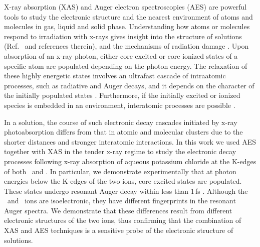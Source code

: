 X-ray absorption (XAS) and Auger electron spectroscopies (AES) are powerful tools to study the electronic structure and the nearest environment of atoms and molecules in gas, liquid and solid phase. Understanding how atoms or molecules respond to irradiation with x-rays gives insight into the structure of solutions (Ref.\ \citep{smith17:13909} and references therein), and the mechanisms of radiation damage \citep{ONeill02:329,Carugo05:213,Stumpf16:237}. Upon absorption of an x-ray photon, either core excited or core ionized states of a specific atom are populated depending on the photon energy. The relaxation of these highly energetic states involves an ultrafast cascade of intraatomic processes, such as radiative and Auger decays, and it depends on the character of the initially populated states \citep{stoychev08:074307,Demekhin08:043421,Demekhin09:104303,Ouchi11:053415,Miteva14:164303,travnikova16:213001,Gokhberg14:661,Trinter14:664}. Furthermore, if the initially excited or ionized species is embedded in an environment, interatomic processes %
are possible  \citep{Pokapanich09:7264,Pokapanich11:13430,Stumpf16:237,unger17:708,ceolin17:263003}.


In a solution, the course of such electronic decay cascades initiated by x-ray photoabsorption differs from that in atomic and molecular clusters due to the shorter distances and stronger interatomic interactions.
In this work we used AES together with XAS in the tender x-ray regime to study the electronic decay processes following x-ray absorption of aqueous potassium chloride at the K-edges of both \ki~and \cli. In particular, we demonstrate experimentally that at photon energies below the K-edges of the two ions, core excited states are populated. These states undergo resonant Auger decay within less than 1\,fs \citep{ceolin17:263003}. Although the \ki~and \cli~ions are isoelectronic, they have different fingerprints in the resonant Auger spectra. We demonstrate that these differences result from different electronic structures of the two ions, thus confirming that the combination of XAS and AES techniques is a sensitive probe of the electronic structure of solutions.


